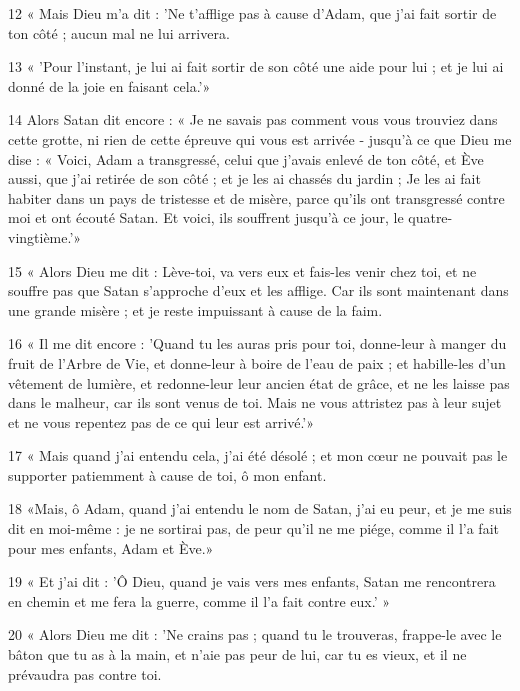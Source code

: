 \par 12 « Mais Dieu m'a dit : 'Ne t'afflige pas à cause d'Adam, que j'ai fait sortir de ton côté ; aucun mal ne lui arrivera.

\par 13 « 'Pour l'instant, je lui ai fait sortir de son côté une aide pour lui ; et je lui ai donné de la joie en faisant cela.'»

\par 14 Alors Satan dit encore : « Je ne savais pas comment vous vous trouviez dans cette grotte, ni rien de cette épreuve qui vous est arrivée - jusqu'à ce que Dieu me dise : « Voici, Adam a transgressé, celui que j'avais enlevé de ton côté, et Ève aussi, que j'ai retirée de son côté ; et je les ai chassés du jardin ; Je les ai fait habiter dans un pays de tristesse et de misère, parce qu'ils ont transgressé contre moi et ont écouté Satan. Et voici, ils souffrent jusqu'à ce jour, le quatre-vingtième.'»

\par 15 « Alors Dieu me dit : Lève-toi, va vers eux et fais-les venir chez toi, et ne souffre pas que Satan s'approche d'eux et les afflige. Car ils sont maintenant dans une grande misère ; et je reste impuissant à cause de la faim.

\par 16 « Il me dit encore : 'Quand tu les auras pris pour toi, donne-leur à manger du fruit de l'Arbre de Vie, et donne-leur à boire de l'eau de paix ; et habille-les d'un vêtement de lumière, et redonne-leur leur ancien état de grâce, et ne les laisse pas dans le malheur, car ils sont venus de toi. Mais ne vous attristez pas à leur sujet et ne vous repentez pas de ce qui leur est arrivé.'»

\par 17 « Mais quand j'ai entendu cela, j'ai été désolé ; et mon cœur ne pouvait pas le supporter patiemment à cause de toi, ô mon enfant.

\par 18 «Mais, ô Adam, quand j'ai entendu le nom de Satan, j'ai eu peur, et je me suis dit en moi-même : je ne sortirai pas, de peur qu'il ne me piége, comme il l'a fait pour mes enfants, Adam et Ève.»

\par 19 « Et j'ai dit : 'Ô Dieu, quand je vais vers mes enfants, Satan me rencontrera en chemin et me fera la guerre, comme il l'a fait contre eux.' »

\par 20 « Alors Dieu me dit : 'Ne crains pas ; quand tu le trouveras, frappe-le avec le bâton que tu as à la main, et n'aie pas peur de lui, car tu es vieux, et il ne prévaudra pas contre toi.

